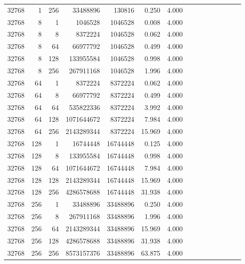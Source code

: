 \begin{longtable}{rrrrrrrrrrrrrrr}
32768 & 1 & 256 & 33488896 & 130816 & 0.250 & 4.000 &  &  &  &  &  &  &  & \\
32768 & 8 & 1 & 1046528 & 1046528 & 0.008 & 4.000 &  &  &  &  &  &  &  & \\
32768 & 8 & 8 & 8372224 & 1046528 & 0.062 & 4.000 &  &  &  &  &  &  &  & \\
32768 & 8 & 64 & 66977792 & 1046528 & 0.499 & 4.000 &  &  &  &  &  &  &  & \\
32768 & 8 & 128 & 133955584 & 1046528 & 0.998 & 4.000 &  &  &  &  &  &  &  & \\
32768 & 8 & 256 & 267911168 & 1046528 & 1.996 & 4.000 &  &  &  &  &  &  &  & \\
32768 & 64 & 1 & 8372224 & 8372224 & 0.062 & 4.000 &  &  &  &  &  &  &  & \\
32768 & 64 & 8 & 66977792 & 8372224 & 0.499 & 4.000 &  &  &  &  &  &  &  & \\
32768 & 64 & 64 & 535822336 & 8372224 & 3.992 & 4.000 &  &  &  &  &  &  &  & \\
32768 & 64 & 128 & 1071644672 & 8372224 & 7.984 & 4.000 &  &  &  &  &  &  &  & \\
32768 & 64 & 256 & 2143289344 & 8372224 & 15.969 & 4.000 &  &  &  &  &  &  &  & \\
32768 & 128 & 1 & 16744448 & 16744448 & 0.125 & 4.000 &  &  &  &  &  &  &  & \\
32768 & 128 & 8 & 133955584 & 16744448 & 0.998 & 4.000 &  &  &  &  &  &  &  & \\
32768 & 128 & 64 & 1071644672 & 16744448 & 7.984 & 4.000 &  &  &  &  &  &  &  & \\
32768 & 128 & 128 & 2143289344 & 16744448 & 15.969 & 4.000 &  &  &  &  &  &  &  & \\
32768 & 128 & 256 & 4286578688 & 16744448 & 31.938 & 4.000 &  &  &  &  &  &  &  & \\
32768 & 256 & 1 & 33488896 & 33488896 & 0.250 & 4.000 &  &  &  &  &  &  &  & \\
32768 & 256 & 8 & 267911168 & 33488896 & 1.996 & 4.000 &  &  &  &  &  &  &  & \\
32768 & 256 & 64 & 2143289344 & 33488896 & 15.969 & 4.000 &  &  &  &  &  &  &  & \\
32768 & 256 & 128 & 4286578688 & 33488896 & 31.938 & 4.000 &  &  &  &  &  &  &  & \\
32768 & 256 & 256 & 8573157376 & 33488896 & 63.875 & 4.000 &  &  &  &  &  &  &  & \\
\end{longtable}
